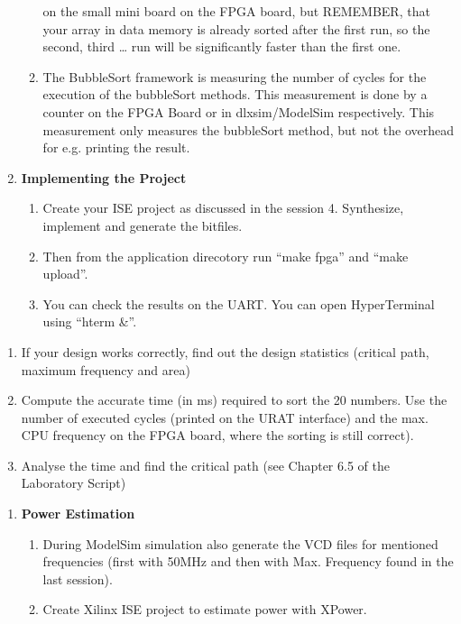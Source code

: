 \documentclass[
]{article}
\begin{document}
\begin{enumerate}
\begin{enumerate}
    on the small mini board on the FPGA board, but REMEMBER, that your
    array in data memory is already sorted after the first run, so the
    second, third \ldots{} run will be significantly faster than the
    first one.
  \item
    The BubbleSort framework is measuring the number of cycles for the
    execution of the bubbleSort methods. This measurement is done by a
    counter on the FPGA Board or in dlxsim/ModelSim respectively. This
    measurement only measures the bubbleSort method, but not the
    overhead for e.g. printing the result.
  \end{enumerate}
\item
  \textbf{Implementing the Project}

  \begin{enumerate}
  \def\labelenumii{\arabic{enumii}.}
  \item
    Create your ISE project as discussed in the session 4. Synthesize,
    implement and generate the bitfiles.
  \item
    Then from the application direcotory run ``make fpga'' and ``make
    upload''.
  \item
    You can check the results on the UART. You can open HyperTerminal
    using ``hterm \&''.
  \end{enumerate}
\end{enumerate}

\begin{enumerate}
\def\labelenumi{\alph{enumi})}
\item
  If your design works correctly, find out the design statistics
  (critical path, maximum frequency and area)
\item
  Compute the accurate time (in ms) required to sort the 20 numbers. Use
  the number of executed cycles (printed on the URAT interface) and the
  max. CPU frequency on the FPGA board, where the sorting is still
  correct).
\item
  Analyse the time and find the critical path (see Chapter 6.5 of the
  Laboratory Script)
\end{enumerate}

\begin{enumerate}
\def\labelenumi{\arabic{enumi}.}
\setcounter{enumi}{2}
\item
  \textbf{Power Estimation}

  \begin{enumerate}
  \def\labelenumii{\arabic{enumii}.}
  \item
    During ModelSim simulation also generate the VCD files for mentioned
    frequencies (first with 50MHz and then with Max. Frequency found in
    the last session).
  \item
    Create Xilinx ISE project to estimate power with XPower.
  \end{enumerate}
\end{enumerate}
\end{document}
